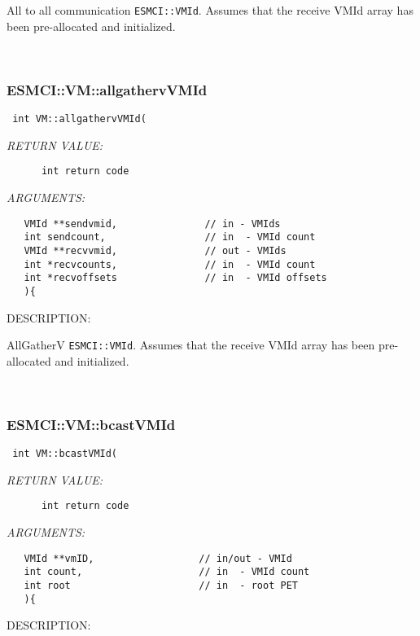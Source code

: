 {      All to all communication {\tt ESMCI::VMId}.  Assumes that the receive VMId
   array has been pre-allocated and initialized.
   
 
\mbox{}\hrulefill\
 
\subsubsection [ESMCI::VM::allgathervVMId] {ESMCI::VM::allgathervVMId}


  
\begin{verbatim} int VM::allgathervVMId(\end{verbatim}{\em RETURN VALUE:}
\begin{verbatim}      int return code\end{verbatim}{\em ARGUMENTS:}
\begin{verbatim}   VMId **sendvmid,               // in - VMIds
   int sendcount,                 // in  - VMId count
   VMId **recvvmid,               // out - VMIds
   int *recvcounts,               // in  - VMId count
   int *recvoffsets               // in  - VMId offsets
   ){\end{verbatim}
{\sf DESCRIPTION:\\ }


      AllGatherV {\tt ESMCI::VMId}.  Assumes that the receive VMId
   array has been pre-allocated and initialized.
   
 
\mbox{}\hrulefill\
 
\subsubsection [ESMCI::VM::bcastVMId] {ESMCI::VM::bcastVMId}


  
\begin{verbatim} int VM::bcastVMId(\end{verbatim}{\em RETURN VALUE:}
\begin{verbatim}      int return code\end{verbatim}{\em ARGUMENTS:}
\begin{verbatim}   VMId **vmID,                  // in/out - VMId
   int count,                    // in  - VMId count
   int root                      // in  - root PET
   ){\end{verbatim}
{\sf DESCRIPTION:\\ }


}
